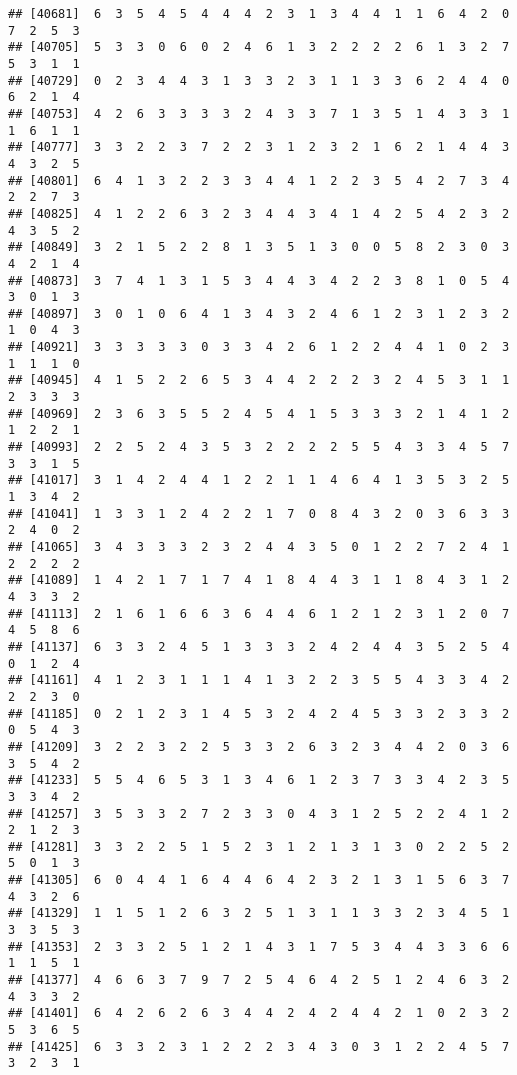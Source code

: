 \documentclass[
]{article}
\begin{document}
\begin{verbatim}
## [40681]  6  3  5  4  5  4  4  4  2  3  1  3  4  4  1  1  6  4  2  0  7  2  5  3
## [40705]  5  3  3  0  6  0  2  4  6  1  3  2  2  2  2  6  1  3  2  7  5  3  1  1
## [40729]  0  2  3  4  4  3  1  3  3  2  3  1  1  3  3  6  2  4  4  0  6  2  1  4
## [40753]  4  2  6  3  3  3  3  2  4  3  3  7  1  3  5  1  4  3  3  1  1  6  1  1
## [40777]  3  3  2  2  3  7  2  2  3  1  2  3  2  1  6  2  1  4  4  3  4  3  2  5
## [40801]  6  4  1  3  2  2  3  3  4  4  1  2  2  3  5  4  2  7  3  4  2  2  7  3
## [40825]  4  1  2  2  6  3  2  3  4  4  3  4  1  4  2  5  4  2  3  2  4  3  5  2
## [40849]  3  2  1  5  2  2  8  1  3  5  1  3  0  0  5  8  2  3  0  3  4  2  1  4
## [40873]  3  7  4  1  3  1  5  3  4  4  3  4  2  2  3  8  1  0  5  4  3  0  1  3
## [40897]  3  0  1  0  6  4  1  3  4  3  2  4  6  1  2  3  1  2  3  2  1  0  4  3
## [40921]  3  3  3  3  3  0  3  3  4  2  6  1  2  2  4  4  1  0  2  3  1  1  1  0
## [40945]  4  1  5  2  2  6  5  3  4  4  2  2  2  3  2  4  5  3  1  1  2  3  3  3
## [40969]  2  3  6  3  5  5  2  4  5  4  1  5  3  3  3  2  1  4  1  2  1  2  2  1
## [40993]  2  2  5  2  4  3  5  3  2  2  2  2  5  5  4  3  3  4  5  7  3  3  1  5
## [41017]  3  1  4  2  4  4  1  2  2  1  1  4  6  4  1  3  5  3  2  5  1  3  4  2
## [41041]  1  3  3  1  2  4  2  2  1  7  0  8  4  3  2  0  3  6  3  3  2  4  0  2
## [41065]  3  4  3  3  3  2  3  2  4  4  3  5  0  1  2  2  7  2  4  1  2  2  2  2
## [41089]  1  4  2  1  7  1  7  4  1  8  4  4  3  1  1  8  4  3  1  2  4  3  3  2
## [41113]  2  1  6  1  6  6  3  6  4  4  6  1  2  1  2  3  1  2  0  7  4  5  8  6
## [41137]  6  3  3  2  4  5  1  3  3  3  2  4  2  4  4  3  5  2  5  4  0  1  2  4
## [41161]  4  1  2  3  1  1  1  4  1  3  2  2  3  5  5  4  3  3  4  2  2  2  3  0
## [41185]  0  2  1  2  3  1  4  5  3  2  4  2  4  5  3  3  2  3  3  2  0  5  4  3
## [41209]  3  2  2  3  2  2  5  3  3  2  6  3  2  3  4  4  2  0  3  6  3  5  4  2
## [41233]  5  5  4  6  5  3  1  3  4  6  1  2  3  7  3  3  4  2  3  5  3  3  4  2
## [41257]  3  5  3  3  2  7  2  3  3  0  4  3  1  2  5  2  2  4  1  2  2  1  2  3
## [41281]  3  3  2  2  5  1  5  2  3  1  2  1  3  1  3  0  2  2  5  2  5  0  1  3
## [41305]  6  0  4  4  1  6  4  4  6  4  2  3  2  1  3  1  5  6  3  7  4  3  2  6
## [41329]  1  1  5  1  2  6  3  2  5  1  3  1  1  3  3  2  3  4  5  1  3  3  5  3
## [41353]  2  3  3  2  5  1  2  1  4  3  1  7  5  3  4  4  3  3  6  6  1  1  5  1
## [41377]  4  6  6  3  7  9  7  2  5  4  6  4  2  5  1  2  4  6  3  2  4  3  3  2
## [41401]  6  4  2  6  2  6  3  4  4  2  4  2  4  4  2  1  0  2  3  2  5  3  6  5
## [41425]  6  3  3  2  3  1  2  2  2  3  4  3  0  3  1  2  2  4  5  7  3  2  3  1

\end{verbatim}
\end{document}
